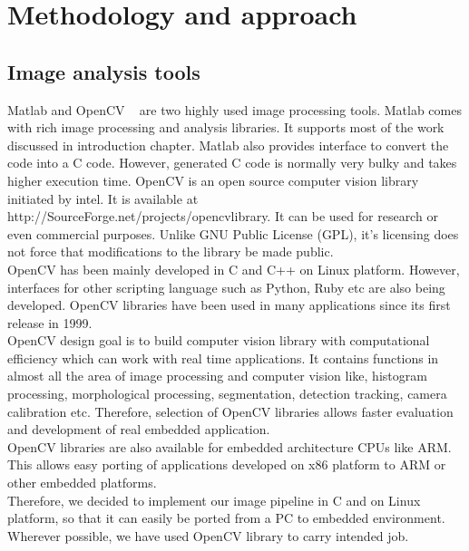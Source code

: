 
\chapter{Methodology and approach} %
\label{Chapter2}

\section{Image analysis tools}

\indent Matlab and OpenCV ~\cite{34} are two highly used image
processing tools.  Matlab comes with rich image processing and analysis
libraries. It supports most of the work discussed in introduction
chapter. Matlab also provides interface to convert the code into a C
code. However, generated C code is normally very bulky and takes higher
execution time. OpenCV is an open source computer vision library
initiated by intel. It is available at
http://SourceForge.net/projects/opencvlibrary. It can be used for
research or even commercial purposes. Unlike GNU Public License (GPL),
it's licensing does not force that modifications to the library be made
public. \\

\indent OpenCV has been mainly developed in C and C++ on Linux platform.
However, interfaces for other scripting language such as Python, Ruby
etc are also being developed. OpenCV libraries have been used in many
applications since its first release in 1999.\\

\indent OpenCV design goal is to build computer vision library with
computational efficiency which can work with real time applications. It
contains functions in almost all the area of image processing  and
computer vision like, histogram processing, morphological processing,
segmentation, detection tracking, camera calibration etc. Therefore,
selection of OpenCV libraries allows faster evaluation and development
of real embedded application.\\

\indent OpenCV libraries are also available for embedded architecture
CPUs like ARM. This allows easy porting of applications developed on x86
platform to ARM or other embedded platforms.\\

\indent Therefore, we decided to implement our image pipeline in C and
on Linux platform, so that it can easily be ported from a PC to embedded
environment. Wherever possible, we have used OpenCV library to carry
intended job.


